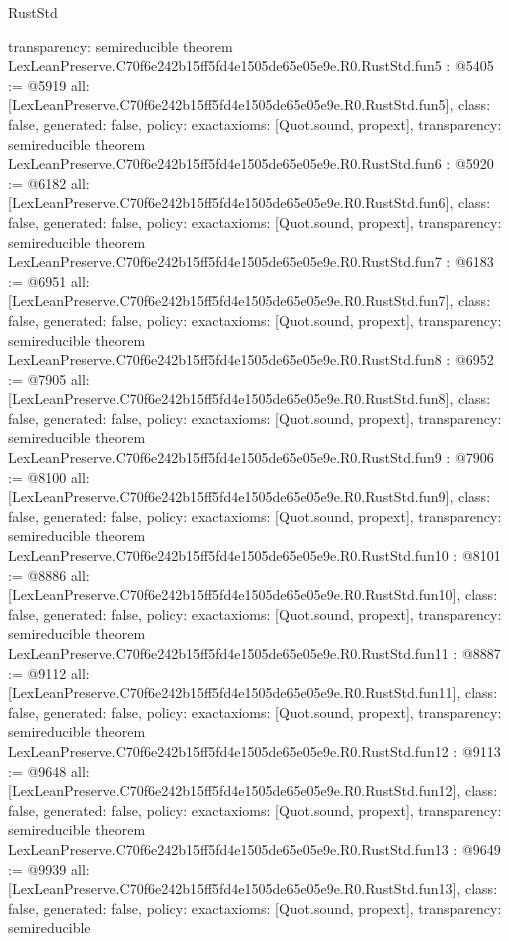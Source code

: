 \begin{lexlean}{RustStd}
\begin{coremodule}
{  transparency: semireducible
}
theorem LexLeanPreserve.C70f6e242b15ff5fd4e1505de65e05e9e.R0.RustStd.fun5 : @5405 := @5919 {
  all: [LexLeanPreserve.C70f6e242b15ff5fd4e1505de65e05e9e.R0.RustStd.fun5],
  class: false,
  generated: false,
  policy: exact{axioms: [Quot.sound, propext]},
  transparency: semireducible
}
theorem LexLeanPreserve.C70f6e242b15ff5fd4e1505de65e05e9e.R0.RustStd.fun6 : @5920 := @6182 {
  all: [LexLeanPreserve.C70f6e242b15ff5fd4e1505de65e05e9e.R0.RustStd.fun6],
  class: false,
  generated: false,
  policy: exact{axioms: [Quot.sound, propext]},
  transparency: semireducible
}
theorem LexLeanPreserve.C70f6e242b15ff5fd4e1505de65e05e9e.R0.RustStd.fun7 : @6183 := @6951 {
  all: [LexLeanPreserve.C70f6e242b15ff5fd4e1505de65e05e9e.R0.RustStd.fun7],
  class: false,
  generated: false,
  policy: exact{axioms: [Quot.sound, propext]},
  transparency: semireducible
}
theorem LexLeanPreserve.C70f6e242b15ff5fd4e1505de65e05e9e.R0.RustStd.fun8 : @6952 := @7905 {
  all: [LexLeanPreserve.C70f6e242b15ff5fd4e1505de65e05e9e.R0.RustStd.fun8],
  class: false,
  generated: false,
  policy: exact{axioms: [Quot.sound, propext]},
  transparency: semireducible
}
theorem LexLeanPreserve.C70f6e242b15ff5fd4e1505de65e05e9e.R0.RustStd.fun9 : @7906 := @8100 {
  all: [LexLeanPreserve.C70f6e242b15ff5fd4e1505de65e05e9e.R0.RustStd.fun9],
  class: false,
  generated: false,
  policy: exact{axioms: [Quot.sound, propext]},
  transparency: semireducible
}
theorem LexLeanPreserve.C70f6e242b15ff5fd4e1505de65e05e9e.R0.RustStd.fun10 : @8101 := @8886 {
  all: [LexLeanPreserve.C70f6e242b15ff5fd4e1505de65e05e9e.R0.RustStd.fun10],
  class: false,
  generated: false,
  policy: exact{axioms: [Quot.sound, propext]},
  transparency: semireducible
}
theorem LexLeanPreserve.C70f6e242b15ff5fd4e1505de65e05e9e.R0.RustStd.fun11 : @8887 := @9112 {
  all: [LexLeanPreserve.C70f6e242b15ff5fd4e1505de65e05e9e.R0.RustStd.fun11],
  class: false,
  generated: false,
  policy: exact{axioms: [Quot.sound, propext]},
  transparency: semireducible
}
theorem LexLeanPreserve.C70f6e242b15ff5fd4e1505de65e05e9e.R0.RustStd.fun12 : @9113 := @9648 {
  all: [LexLeanPreserve.C70f6e242b15ff5fd4e1505de65e05e9e.R0.RustStd.fun12],
  class: false,
  generated: false,
  policy: exact{axioms: [Quot.sound, propext]},
  transparency: semireducible
}
theorem LexLeanPreserve.C70f6e242b15ff5fd4e1505de65e05e9e.R0.RustStd.fun13 : @9649 := @9939 {
  all: [LexLeanPreserve.C70f6e242b15ff5fd4e1505de65e05e9e.R0.RustStd.fun13],
  class: false,
  generated: false,
  policy: exact{axioms: [Quot.sound, propext]},
  transparency: semireducible
}
\end{coremodule}
\end{lexlean}
